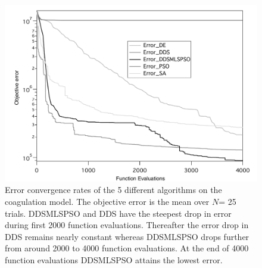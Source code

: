 \documentclass[12pt]{article}
\begin{document}
\begin{figure}[H]
\centering
\includegraphics[width=1.0\textwidth,height=0.5\textheight]{./figs/Figure_3_Errors_convergence.pdf}
\caption{Error convergence rates of the 5 different algorithms on the coagulation model. The objective error is the mean over $N$= 25 trials. DDSMLSPSO and DDS have the steepest drop in error during first 2000 function evaluations. Thereafter the error drop in DDS remains nearly constant whereas DDSMLSPSO drops further from around 2000 to 4000 function evaluations. At the end of 4000 function evaluations DDSMLSPSO attains the lowest error.
}\label{fig-train}
\end{figure}
\end{document}

